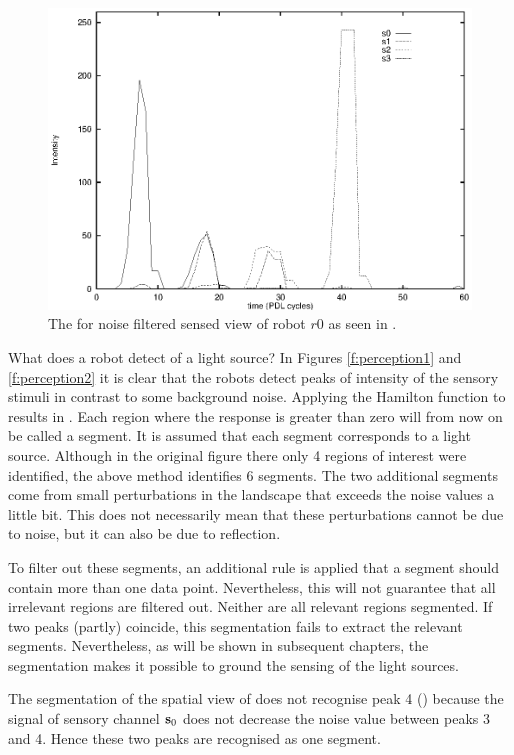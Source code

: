 \begin{figure}[t]
\centerline{\includegraphics[width=12cm]{lang_games/region1.eps}}
\caption{The for noise filtered sensed view of robot $r0$ as seen in .}
\label{f:region1}
\end{figure}

What does a robot detect of a light source? In Figures \ref{f:perception1} and \ref{f:perception2} it is clear that the robots detect peaks of intensity of the sensory stimuli in contrast to some background noise. Applying the Hamilton function to  results in . Each region where the response is greater than zero will from now on be called a segment. It is assumed that each segment corresponds to a light source. Although in the original figure there only 4 regions of interest were identified, the above method identifies 6 segments. The two additional segments come from small perturbations in the landscape that exceeds the noise values a little bit. This does not necessarily mean that these perturbations cannot be due to noise, but it can also be due to reflection.

To filter out these segments, an additional rule is applied that a segment should contain more than one data point. Nevertheless, this will not guarantee that all irrelevant regions are filtered out. Neither are all relevant regions segmented. If two peaks (partly) coincide, this segmentation fails to extract the relevant segments. Nevertheless, as will be shown in subsequent chapters, the segmentation makes it possible to ground the sensing of the light sources.

The segmentation of the spatial view of  does not recognise peak 4 () because the signal of sensory channel ${\bf s}_0$ does not decrease the noise value between peaks 3 and 4. Hence these two peaks are recognised as one segment.

